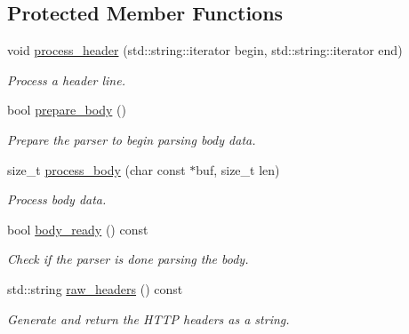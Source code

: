 \subsection*{Protected Member Functions}
\begin{DoxyCompactItemize}
\item 
void \hyperlink{classwebsocketpp_1_1http_1_1parser_1_1parser_a4dbb443fd916f8b4306e7afdb2e8ff45}{process\+\_\+header} (std\+::string\+::iterator begin, std\+::string\+::iterator end)
\begin{DoxyCompactList}\small\item\em Process a header line. \end{DoxyCompactList}\item 
bool \hyperlink{classwebsocketpp_1_1http_1_1parser_1_1parser_aabf5f8c33cad9202520337f8e2ed7aa5}{prepare\+\_\+body} ()
\begin{DoxyCompactList}\small\item\em Prepare the parser to begin parsing body data. \end{DoxyCompactList}\item 
size\+\_\+t \hyperlink{classwebsocketpp_1_1http_1_1parser_1_1parser_a3dc340d076f732092aed32c42d277503}{process\+\_\+body} (char const $\ast$buf, size\+\_\+t len)
\begin{DoxyCompactList}\small\item\em Process body data. \end{DoxyCompactList}\item 
bool \hyperlink{classwebsocketpp_1_1http_1_1parser_1_1parser_a7d5eb3a888a59570d2b9cfcc3939bbd0}{body\+\_\+ready} () const
\begin{DoxyCompactList}\small\item\em Check if the parser is done parsing the body. \end{DoxyCompactList}\item 
std\+::string \hyperlink{classwebsocketpp_1_1http_1_1parser_1_1parser_ad38cb09ac5ad2a2d9de65c6d34bb5875}{raw\+\_\+headers} () const
\begin{DoxyCompactList}\small\item\em Generate and return the H\+T\+TP headers as a string. \end{DoxyCompactList}\end{DoxyCompactItemize}
